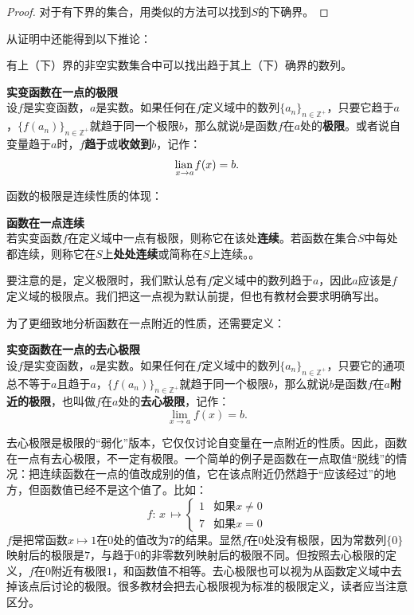 \documentclass[12pt,UTF8]{ctexbook}
\begin{document}
\begin{appendix}
\begin{proof}
    对于有下界的集合，用类似的方法可以找到$S$的下确界。

\end{proof}

从证明中还能得到以下推论：
\begin{tm}\label{tm:b-0-5}
    有上（下）界的非空实数集合中可以找出趋于其上（下）确界的数列。
\end{tm}

\begin{df}\textbf{实变函数在一点的极限}
    \mbox{}\\
    设$f$是实变函数，$a$是实数。如果任何在$f$定义域中的数列$\{a_n\}_{n\in\mathbb{Z}^+}$，只要它趋于$a$，$\{f(a_n)\}_{n\in\mathbb{Z}^+}$就趋于同一个极限$b$，那么就说$b$是函数$f$在$a$处的\textbf{极限}。或者说自变量趋于$a$时，$f$\textbf{趋于}或\textbf{收敛到}$b$，记作：
    $$  \underset{x \to a}{\operatorname{lian}\,} f(x) = b. $$
\end{df}
函数的极限是连续性质的体现：
\begin{df}{\textbf{函数在一点连续}}\\
    若实变函数$f$在定义域中一点有极限，则称它在该处\textbf{连续}。若函数在集合$S$中每处都连续，则称它在$S$上\textbf{处处连续}或简称在$S$上连续。。
\end{df}
要注意的是，定义极限时，我们默认总有$f$定义域中的数列趋于$a$，因此$a$应该是$f$定义域的极限点。我们把这一点视为默认前提，但也有教材会要求明确写出。

为了更细致地分析函数在一点附近的性质，还需要定义：
\begin{df}\textbf{实变函数在一点的去心极限}
    \mbox{}\\
    设$f$是实变函数，$a$是实数。如果任何在$f$定义域中的数列$\{a_n\}_{n\in\mathbb{Z}^+}$，只要它的通项总不等于$a$且趋于$a$，$\{f(a_n)\}_{n\in\mathbb{Z}^+}$就趋于同一个极限$b$，那么就说$b$是函数$f$在$a$\textbf{附近的极限}，也叫做$f$在$a$处的\textbf{去心极限}，记作：
    $$  \lim_{x \to a} f(x) = b. $$
\end{df}
去心极限是极限的“弱化”版本，它仅仅讨论自变量在一点附近的性质。因此，函数在一点有去心极限，不一定有极限。一个简单的例子是函数在一点取值“脱线”的情况：把连续函数在一点的值改成别的值，它在该点附近仍然趋于“应该经过”的地方，但函数值已经不是这个值了。比如：
$$
f: \, x\, \mapsto \begin{cases}
    1 & \mbox{如果}x \neq 0 \\
    7 & \mbox{如果}x = 0
\end{cases} 
$$
$f$是把常函数$x\mapsto 1$在$0$处的值改为$7$的结果。显然$f$在$0$处没有极限，因为常数列$\{0\}$映射后的极限是$7$，与趋于$0$的非零数列映射后的极限不同。但按照去心极限的定义，$f$在$0$附近有极限$1$，和函数值不相等。去心极限也可以视为从函数定义域中去掉该点后讨论的极限。很多教材会把去心极限视为标准的极限定义，读者应当注意区分。


\end{appendix}
\end{document}

